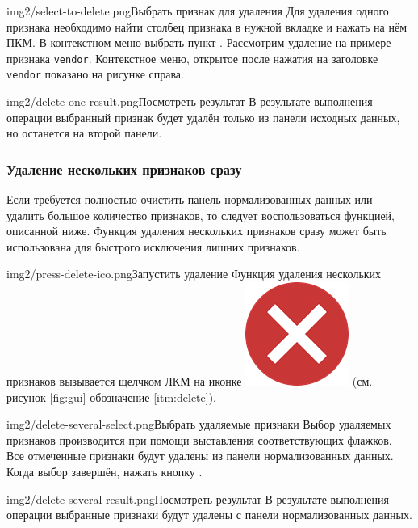 \documentclass[12pt,tikz]{instruction}
\begin{document}
\begin{steps}
	\begin{ist}{img2/select-to-delete.png}{Выбрать признак для удаления}
		Для удаления одного признака необходимо найти столбец признака в нужной вкладке и нажать на нём ПКМ. В контекстном меню выбрать пункт . Рассмотрим удаление на примере признака \texttt{vendor}. Контекстное меню, открытое после нажатия на заголовке \texttt{vendor} показано на рисунке справа.
	\end{ist}
	\begin{ist}{img2/delete-one-result.png}{Посмотреть результат}
		В результате выполнения операции выбранный признак будет удалён только из панели исходных данных, но останется на второй панели.
	\end{ist}		
\end{steps}

\newpage
\subsubsection{Удаление нескольких признаков сразу}

Если требуется полностью очистить панель нормализованных данных или удалить большое количество признаков, то следует воспользоваться функцией, описанной ниже. Функция удаления нескольких признаков сразу может быть использована для быстрого исключения лишних признаков.

\begin{steps}
	\begin{ist}{img2/press-delete-ico.png}{Запустить удаление}
		Функция удаления нескольких признаков вызывается щелчком ЛКМ на иконке \includegraphics[scale=0.1]{img2/delete.png} (см. рисунок \ref{fig:gui} обозначение \ref{itm:delete}).
	\end{ist}
	\begin{ist}{img2/delete-several-select.png}{Выбрать удаляемые признаки}
		Выбор удаляемых признаков производится при помощи выставления соответствующих флажков. Все отмеченные признаки будут удалены из панели нормализованных данных. Когда выбор завершён, нажать кнопку .
	\end{ist}	
	\begin{ist}{img2/delete-several-result.png}{Посмотреть результат}
		В результате выполнения операции выбранные признаки будут удалены с панели нормализованных данных.
	\end{ist}	
		
\end{steps}
\end{document}
